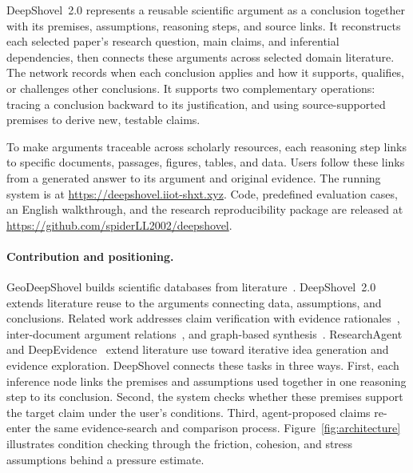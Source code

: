 \documentclass[sigconf,screen,review]{acmart}
\newcommand{\sys}{DeepShovel~2.0}
\begin{document}
\sys{} represents a reusable scientific argument as a conclusion together with its premises, assumptions, reasoning steps, and source links. It reconstructs each selected paper's research question, main claims, and inferential dependencies, then connects these arguments across selected domain literature. The network records when each conclusion applies and how it supports, qualifies, or challenges other conclusions. It supports two complementary operations: tracing a conclusion backward to its justification, and using source-supported premises to derive new, testable claims.

To make arguments traceable across scholarly resources, each reasoning step links to specific documents, passages, figures, tables, and data. Users follow these links from a generated answer to its argument and original evidence. The running system is at \url{https://deepshovel.iiot-shxt.xyz}. Code, predefined evaluation cases, an English walkthrough, and the research reproducibility package are released at \url{https://github.com/spiderLL2002/deepshovel}.

\paragraph{Contribution and positioning.}
GeoDeepShovel builds scientific databases from literature~\cite{geodeepshovel}. DeepShovel~2.0 extends literature reuse to the arguments connecting data, assumptions, and conclusions. Related work addresses claim verification with evidence rationales~\cite{scifact}, inter-document argument relations~\cite{argumentweb}, and graph-based synthesis~\cite{graphrag}. ResearchAgent~\cite{researchagent} and DeepEvidence~\cite{deepevidence} extend literature use toward iterative idea generation and evidence exploration. DeepShovel connects these tasks in three ways. First, each inference node links the premises and assumptions used together in one reasoning step to its conclusion. Second, the system checks whether these premises support the target claim under the user's conditions. Third, agent-proposed claims re-enter the same evidence-search and comparison process. Figure~\ref{fig:architecture} illustrates condition checking through the friction, cohesion, and stress assumptions behind a pressure estimate.
\end{document}
